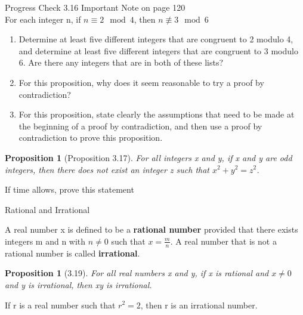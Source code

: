 \documentclass{beamer}
\newtheorem{prop}[theorem]{Proposition}
\begin{document}
\begin{frame}{Progress Check 3.16}
    Important Note on page 120\\
    
    For each integer n, if $n \equiv 2 \mod 4$, then $n \not \equiv 3 \mod{6}$
    \begin{enumerate}
        \item Determine at least five different integers that are congruent to 2 modulo 4, and determine at least five different integers that are congruent to 3 modulo 6.  Are there any integers that are in both of these lists? \pause
        \item For this proposition, why does it seem reasonable to try a proof by contradiction? \pause
        \item For this proposition, state clearly the assumptions that need to be made at the beginning of a proof by contradiction, and then use a proof by contradiction to prove this proposition.
    \end{enumerate}
\end{frame}

\begin{frame}{3.18}
    \begin{prop}[Proposition 3.17]
    For all integers x and y, if x and y are odd integers, then there does not exist an integer z such that $x^2 + y^2 = z^2$.
    \end{prop}
    If time allows, prove this statement
\end{frame}

\begin{frame}{Rational and Irrational}
    \begin{definition}
    A real number x is defined to be a \textbf{rational number} provided that there exists integers m and n with $n \neq 0$ such that $x = \frac{m}{n}$.  A real number that is not a rational number is called \textbf{irrational}.
    \end{definition}
    
    \begin{prop}[3.19]
        For all real numbers x and y, if x is rational and $x \neq 0$ and y is irrational, then xy is irrational.
    \end{prop}
    
    \begin{theorem}
    If r is a real number such that $r^2 = 2$, then r is an irrational number.
    \end{theorem}
\end{frame}
\end{document}
